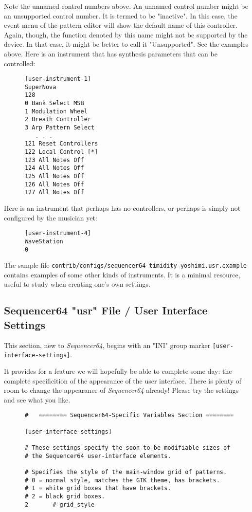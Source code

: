    Note the unnamed control numbers above.
   An unnamed control number might be an unsupported control number.
   It is termed to be "inactive".  In this case, the event menu of
   the pattern editor will show the default name of this controller.
   Again, though, the function denoted by this name might not be supported by
   the device.  In that case, it might be better to call it "Unsupported".
   See the examples above.
   Here is an instrument that has synthesis parameters that can be controlled:

   \begin{verbatim}
      [user-instrument-1]
      SuperNova
      128
      0 Bank Select MSB
      1 Modulation Wheel
      2 Breath Controller
      3 Arp Pattern Select
         . . .
      121 Reset Controllers
      122 Local Control [*]
      123 All Notes Off
      124 All Notes Off
      125 All Notes Off
      126 All Notes Off
      127 All Notes Off
   \end{verbatim}

   Here is an instrument that perhaps has no controllers, or perhaps is simply
   not configured by the musician yet:

   \begin{verbatim}
      [user-instrument-4]
      WaveStation
      0
   \end{verbatim}

   The sample file
   \texttt{contrib/configs/sequencer64-timidity-yoshimi.usr.example}
   contains examples of some other kinds of instruments.
   It is a minimal resource, useful to study when creating one's own settings.

\subsection{Sequencer64 "usr" File / User Interface Settings}
\label{subsec:seq64_usr_file_user_interface_settings}

   This section, new to \textsl{Sequencer64}, begins with an
   "INI" group marker \texttt{[user-interface-settings]}.

   It provides for a feature we will hopefully be able to complete some day:
   the complete specificition of the appearance of the user interface.
   There is plenty of room to change the appearance of
   \textsl{Sequencer64} already!  Please try the settings and see what you
   like.

   \begin{verbatim}
      #   ======== Sequencer64-Specific Variables Section ========

      [user-interface-settings]

      # These settings specify the soon-to-be-modifiable sizes of
      # the Sequencer64 user-interface elements.

      # Specifies the style of the main-window grid of patterns.
      # 0 = normal style, matches the GTK theme, has brackets.
      # 1 = white grid boxes that have brackets.
      # 2 = black grid boxes.
      2       # grid_style
   \end{verbatim}

